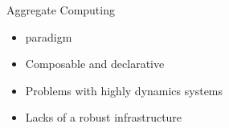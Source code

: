 \begin{frame}{Aggregate Computing}
  \begin{cardTiny}
    \begin{itemize}
      \item[\faThumbsUp]  paradigm
      \item[\faThumbsUp] Composable and declarative 
      \item[{\color{materialRed} \faThumbsDown}] Problems with highly dynamics systems
      \item[{\color{materialRed} \faThumbsDown}] Lacks of a robust infrastructure
    \end{itemize}
  \end{cardTiny}

  \begin{columns}
    \begin{column}{0.51\textwidth}
    \end{column}
    \begin{column}{0.35\textwidth}
    \end{column}
  \end{columns}
\end{frame}